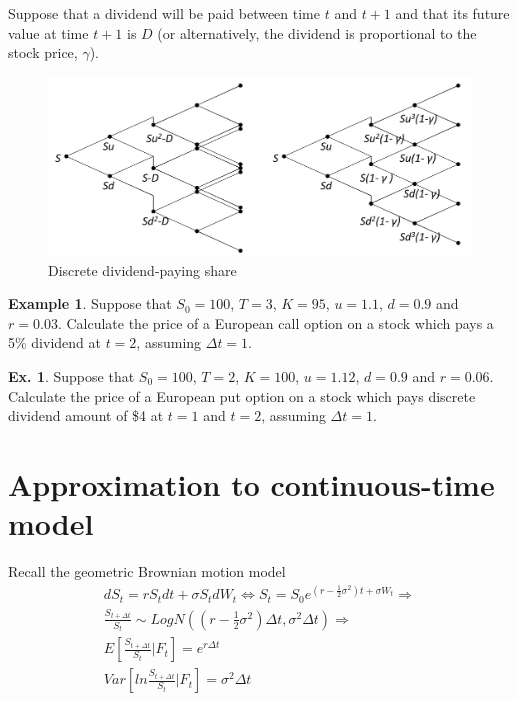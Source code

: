\documentclass[11pt,a4paper]{book}
\theoremstyle{definition}\newtheorem{definition}{Definition}
\theoremstyle{definition}\newtheorem{fact}{Fact}
\theoremstyle{definition}\newtheorem{remark}{Remark}
\theoremstyle{definition}\newtheorem{ex}{Ex.}
\theoremstyle{definition}\newtheorem{project}{Project}
\theoremstyle{definition}\newtheorem{problem}{Problem}
\theoremstyle{definition}\newtheorem{example}{Example}
\numberwithin{theorem}{section}
\numberwithin{corollary}{chapter}
\numberwithin{assumption}{chapter}
\numberwithin{definition}{chapter}
\numberwithin{prop}{chapter}
\numberwithin{notation}{chapter}
\numberwithin{problem}{chapter}
\numberwithin{example}{chapter}
\numberwithin{fact}{chapter}
\numberwithin{ex}{chapter}
\begin{document}
Suppose that a dividend will be paid between time $t$ and $t+1$ and that its future value at time $t+1$ is $D$ (or alternatively, the dividend is proportional to the stock price, $\gamma$).

\begin{figure}[H]
	\centering
	\includegraphics[scale=0.5]{Chapter 4/Chapter4_3.png}
	\caption{Discrete dividend-paying share}
\end{figure}

\begin{example}
Suppose that $S_0=100$, $T=3$, $K=95$, $u=1.1$, $d=0.9$ and $r=0.03$. Calculate the price of a European call option on a stock which pays a 5\% dividend at $t=2$, assuming $\Delta t = 1$.
\end{example}

\begin{ex}
Suppose that $S_0=100$, $T=2$, $K=100$, $u=1.12$, $d=0.9$ and $r=0.06$. Calculate the price of a European put option on a stock which pays discrete dividend amount of \$4 at $t=1$ and $t=2$, assuming $\Delta t = 1$.
\end{ex}

\section{Approximation to continuous-time model}

Recall the geometric Brownian motion model
\begin{align}
dS_t = rS_t dt + \sigma S_t dW_t \Longleftrightarrow S_t = S_0 e^{(r-\frac{1}{2}\sigma^2)t + \sigma W_t} \Longrightarrow \nonumber \\
\frac{S_{t+\Delta t}}{S_t} \sim LogN\left( \left(r-\frac{1}{2}\sigma^2 \right) \Delta t, \sigma^2 \Delta t \right) \Longrightarrow \nonumber \\
E\left[ \frac{S_{t+\Delta t}}{S_t} | F_t \right] = e^{r \Delta t} \nonumber \\
Var\left[ ln \frac{S_{t+\Delta t}}{S_t} | F_t \right] = \sigma^2 \Delta t
\end{align}
\end{document}
